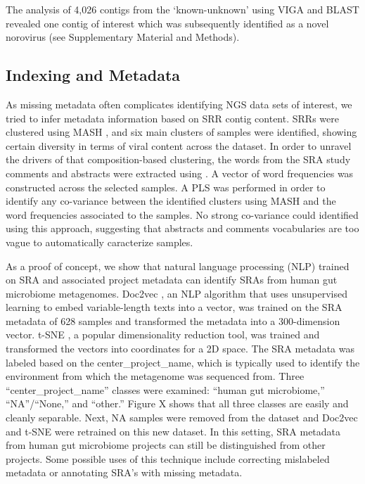   The analysis of 4,026 contigs from the ‘known-unknown’ using VIGA
  \cite{Gonzalez-Tortuero2018} and BLAST \cite{Camacho2009} revealed one contig
  of interest which was subsequently identified as a novel norovirus (see
  Supplementary Material and Methods).

  \subsection{Indexing and Metadata}
  As missing metadata often complicates identifying NGS data sets of interest,
  we tried to infer metadata information based on SRR contig content. SRRs were
  clustered using MASH \cite{Ondov2019}, and six main clusters of samples were
  identified, showing certain diversity in terms of viral content across the
  dataset. In order to unravel the drivers of that composition-based
  clustering, the words from the SRA study comments and abstracts were
  extracted using \cite{Zhu2013}. A vector of word frequencies was constructed
  across the selected samples. A PLS was performed in order to identify any
  co-variance between the identified clusters using MASH and the word
  frequencies associated to the samples. No strong co-variance could identified
  using this approach, suggesting that abstracts and comments vocabularies are
  too vague to automatically caracterize samples.

  As a proof of concept, we show that natural language processing (NLP) trained
  on SRA and associated project metadata can identify SRAs from human gut
  microbiome metagenomes. Doc2vec \cite{Le2014}, an NLP algorithm that uses
  unsupervised
  learning to embed variable-length texts into a vector, was trained on the SRA
  metadata of 628 samples and transformed the metadata into a 300-dimension
  vector. t-SNE \cite{vanDerMaaten2008}, a popular dimensionality reduction tool, was trained and
  transformed the vectors into coordinates for a 2D space. The SRA metadata was
  labeled based on the center\_project\_name, which is typically used to identify
  the environment from which the metagenome was sequenced from. Three
  “center\_project\_name” classes were examined: “human gut microbiome,”
  “NA”/“None,” and “other.” Figure X shows that all three classes are easily
  and cleanly separable. Next, NA samples were removed from the dataset and
  Doc2vec and t-SNE were retrained on this new dataset. In this setting, SRA
  metadata from human gut microbiome projects can still be distinguished from
  other projects. Some possible uses of this technique include correcting
  mislabeled metadata or annotating SRA’s with missing metadata.

